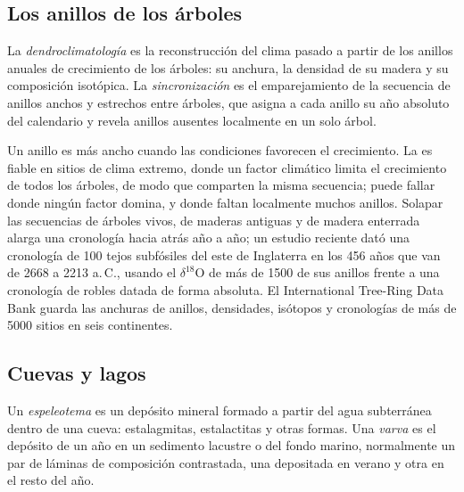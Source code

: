 \subsection*{Los anillos de los árboles}

\begin{definition}\label{def:b2:climate-proxies:dendro}
La \emph{dendroclimatología} es la reconstrucción del clima pasado a partir de los
anillos anuales de crecimiento de los árboles: su anchura, la densidad de su madera y su composición
isotópica. La \emph{sincronización} es el emparejamiento de la secuencia de anillos anchos y
estrechos entre árboles, que asigna a cada anillo su año absoluto del calendario y revela
anillos ausentes localmente en un solo árbol.
\end{definition}

Un anillo es más ancho cuando las condiciones favorecen el crecimiento. La  es fiable en sitios de clima extremo, donde un
factor climático limita el crecimiento de todos los árboles, de modo que comparten la misma secuencia; puede
fallar donde ningún factor domina, y donde faltan localmente muchos anillos.
Solapar las secuencias de árboles vivos, de maderas antiguas y de madera enterrada alarga una cronología hacia atrás
año a año; un estudio reciente dató una cronología de 100 tejos subfósiles del este de Inglaterra en los
456 años que van de 2668 a 2213 a.\,C., usando el $\delta^{18}$O de más de \num{1500} de sus anillos
frente a una cronología de robles datada de forma absoluta. El International Tree-Ring Data Bank guarda las anchuras de
anillos, densidades, isótopos y cronologías de más de \num{5000} sitios en seis continentes.

\subsection*{Cuevas y lagos}

\begin{definition}\label{def:b2:climate-proxies:archives}
Un \emph{espeleotema} es un depósito mineral formado a partir del agua subterránea dentro de una
cueva: estalagmitas, estalactitas y otras formas. Una \emph{varva} es
el depósito de un año en un sedimento lacustre o del fondo marino, normalmente un par de láminas de
composición contrastada, una depositada en verano y otra en el resto del año.
\end{definition}

